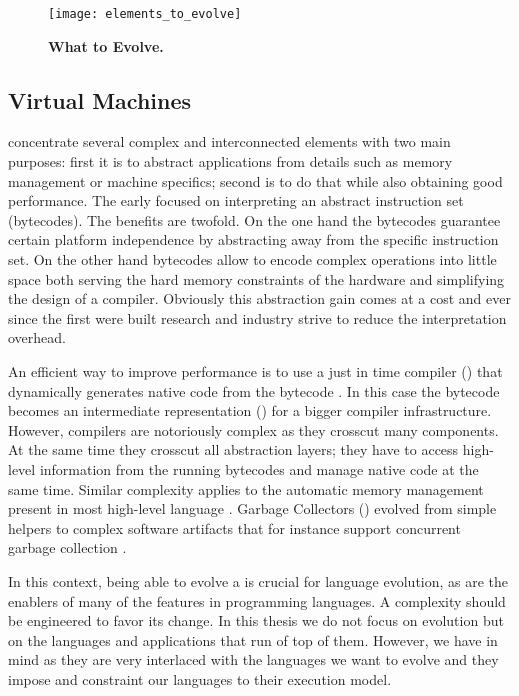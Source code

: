 \begin{figure}[!ht]
\begin{center}
\texttt{[image: elements\_to\_evolve]}
\caption{\textbf{What to Evolve.}\label{fig:whatToEvolve}}
\end{center}
\end{figure}



\subsection{Virtual Machines}

\VMs concentrate several complex and interconnected elements with two main purposes: first it is to abstract applications from details such as memory management or machine specifics; second is to do that while also obtaining good performance.
The early \VMs focused on interpreting an abstract instruction set (bytecodes).
The benefits are twofold.
On the one hand the bytecodes guarantee certain platform independence by abstracting away from the \CPU specific instruction set.
On the other hand bytecodes allow to encode complex operations into little space both serving the hard memory constraints of the hardware and simplifying the design of a compiler.
Obviously this abstraction gain comes at a cost and ever since the first \VMs were built research and industry strive to reduce the interpretation overhead.

An efficient way to improve performance is to use a just in time compiler (\JIT) that dynamically generates native code from the bytecode \cite{Deut84a}.
In this case the bytecode becomes an intermediate representation (\IR) for a bigger compiler infrastructure.
However, \JIT compilers are notoriously complex as they crosscut many \VM components.
At the same time they crosscut all abstraction layers; they have to access high-level information from the running bytecodes and manage native code at the same time.
Similar complexity applies to the automatic memory management present in most high-level language \VMs.
Garbage Collectors (\GC) evolved from simple helpers to complex software artifacts that for instance support concurrent garbage collection \cite{Clic05a}.

In this context, being able to evolve a \VM is crucial for language evolution, as \VMs are the enablers of many of the features in programming languages. A \VM complexity should be engineered to favor its change. In this thesis we do not focus on \VM evolution but on the languages and applications that run of top of them. However, we have \VMs in mind as they are very interlaced with the languages we want to evolve and they impose and constraint our languages to their execution model.

